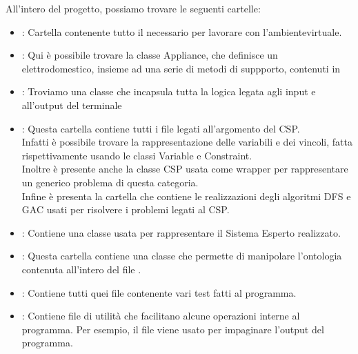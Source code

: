 \documentclass[12pt, letterpaper]{article}
\begin{document}
All'intero del progetto, possiamo trovare le seguenti cartelle:
\begin{itemize}
      \item {}: Cartella contenente tutto il necessario per lavorare con
            l'ambientevirtuale.
      \item {}: Qui è possibile trovare la classe Appliance, che definisce
            un elettrodomestico, insieme ad una serie di metodi di suppporto,
            contenuti in 

      \item {}: Troviamo una classe che incapsula tutta la logica legata agli input
            e all'output del terminale

      \item {}: Questa cartella contiene tutti i file legati all'argomento del
            CSP. \\
            Infatti è possibile trovare la rappresentazione delle variabili e dei vincoli, fatta
            rispettivamente usando le classi Variable e Constraint. \\
            Inoltre è presente anche la classe CSP usata come wrapper per rappresentare un generico
            problema di questa categoria. \\
            Infine è presenta la cartella  che contiene le realizzazioni degli
            algoritmi DFS e GAC usati per risolvere i problemi legati al CSP.

      \item {}: Contiene una classe usata per rappresentare il Sistema Esperto
            realizzato.

      \item {}: Questa cartella contiene una classe che permette di manipolare
            l'ontologia contenuta all'intero del file .

      \item {}: Contiene tutti quei file contenente vari test fatti al programma.

      \item {}: Contiene file di utilità che facilitano alcune operazioni interne al programma.
            Per esempio, il file  viene usato per impaginare l'output del programma.
\end{itemize}
\end{document}
